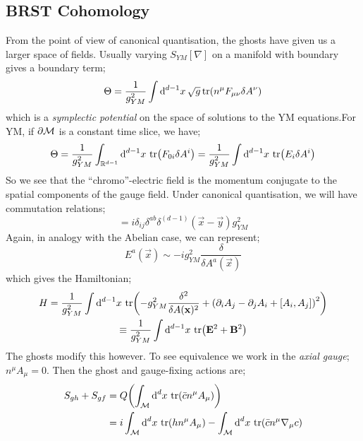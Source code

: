 \subsection{BRST Cohomology}
From the point of view of canonical quantisation, the ghosts have given us a larger space of fields. Usually varying $S_{YM}[\nabla]$ on a manifold with boundary gives a boundary term;
\begin{equation*}
\Theta = \frac{1}{g^2_{YM}}\int{\upd{^{d - 1} x}\sqrt{g}\tr\left(n^\mu F_{\mu\nu}\delta A^\nu\right)}
\end{equation*}
which is a \emph{symplectic potential} on the space of solutions to the YM equations.\footnotemark For YM, if $\partial \mathcal{M}$ is a constant time slice, we have;
\begin{equation*}
\Theta = \frac{1}{g^2_{YM}}\int_{\RR^{d - 1}}{\upd{^{d - 1} x}\tr\left(F_{0i}\delta A^i\right)} = \frac{1}{g^2_{YM}}\int{\upd{^{d - 1} x}\tr\left(E_i \delta A^i\right)}
\end{equation*}
So we see that the ``chromo''-electric field is the momentum conjugate to the spatial components of the gauge field. Under canonical quantisation, we will have commutation relations;
\begin{equation*}
[A_i^a(\vec{x}), E_j^b(\vec{y})] = i\delta_{ij}\delta^{ab}\delta^{(d - 1)}(\vec{x} - \vec{y})g_{YM}^2
\end{equation*}
Again, in analogy with the Abelian case, we can represent;
\begin{equation*}
E^a(\vec{x}) \sim -ig^2_{YM}\frac{\delta}{\delta A^a(\vec{x})}
\end{equation*}
which gives the Hamiltonian;
\begin{multline}
H = \frac{1}{g^2_{YM}}\int{\upd{^{d - 1}x}\tr\left( -g_{YM}^2\frac{\delta^2}{\delta A(\vec{x})^2} + \left(\del_i A_j - \del_j A_i + [A_i, A_j]\right)^2\right)} \\ \equiv \frac{1}{g^2_{YM}}\int{\upd{^{d - 1}x}\tr\left(\vec{E}^2 + \vec{B}^2\right)}
\end{multline}
The ghosts modify this however. To see equivalence we work in the \emph{axial gauge}; $n^\mu A_\mu = 0$. Then the ghost and gauge-fixing actions are;
\begin{align*}
S_{gh} + S_{gf} &= Q\left(\int_{\mM}{\upd{^d x}\tr(\bar{c}n^{\mu}A_\mu)}\right) \\
&= i\int_{\mM}{\upd{^d x}\tr(h n^\mu A_\mu)} - \int_{\mM}{\upd{^d x}\tr(\bar{c}n^{\mu}\nabla_\mu c)}
\end{align*}

